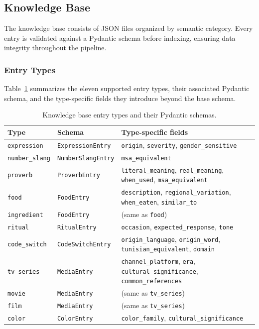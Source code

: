 \subsection{Knowledge Base}
\label{subsec:kb}

The knowledge base consists of JSON files organized by semantic category.
Every entry is validated against a Pydantic schema before indexing, ensuring
data integrity throughout the pipeline.

\subsubsection{Entry Types}

Table~\ref{tab:types} summarizes the eleven supported entry types, their associated
Pydantic schema, and the type-specific fields they introduce beyond the base schema.

\begin{table}[htbp]
\centering
\renewcommand{\arraystretch}{1.25}
\begin{tabularx}{\textwidth}{@{} l l X @{}}
\toprule
\textbf{Type} & \textbf{Schema} & \textbf{Type-specific fields} \\
\midrule
\texttt{expression}    & \texttt{ExpressionEntry}   & \texttt{origin}, \texttt{severity}, \texttt{gender\_sensitive} \\
\texttt{number\_slang} & \texttt{NumberSlangEntry}  & \texttt{msa\_equivalent} \\
\texttt{proverb}       & \texttt{ProverbEntry}      & \texttt{literal\_meaning}, \texttt{real\_meaning}, \texttt{when\_used}, \texttt{msa\_equivalent} \\
\texttt{food}          & \texttt{FoodEntry}         & \texttt{description}, \texttt{regional\_variation}, \texttt{when\_eaten}, \texttt{similar\_to} \\
\texttt{ingredient}    & \texttt{FoodEntry}         & (same as \texttt{food}) \\
\texttt{ritual}        & \texttt{RitualEntry}       & \texttt{occasion}, \texttt{expected\_response}, \texttt{tone} \\
\texttt{code\_switch}  & \texttt{CodeSwitchEntry}   & \texttt{origin\_language}, \texttt{origin\_word}, \texttt{tunisian\_equivalent}, \texttt{domain} \\
\texttt{tv\_series}    & \texttt{MediaEntry}        & \texttt{channel\_platform}, \texttt{era}, \texttt{cultural\_significance}, \texttt{common\_references} \\
\texttt{movie}         & \texttt{MediaEntry}        & (same as \texttt{tv\_series}) \\
\texttt{film}          & \texttt{MediaEntry}        & (same as \texttt{tv\_series}) \\
\texttt{color}         & \texttt{ColorEntry}        & \texttt{color\_family}, \texttt{cultural\_significance} \\
\bottomrule
\end{tabularx}
\caption{Knowledge base entry types and their Pydantic schemas.}
\label{tab:types}
\end{table}

